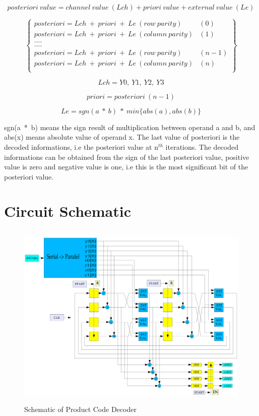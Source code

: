 \documentclass[a4paper,12pt]{report}
\begin{document}
\begin{equation}
posteriori~value = channel~value~(Lch) + priori~value +
external~value~(Le)
\end{equation}

\begin{equation}
\left\{
\begin{array}{lr}
posteriori = Lch~+~priori~+~Le~(row~parity)      & (0)\\
posteriori = Lch~+~priori~+~Le~(column~parity)   & (1)\\
....\\
....\\
posteriori = Lch~+~priori~+~Le~(row~parity)      & (n-1)\\
posteriori = Lch~+~priori~+~Le~(column~parity)   & (n)\\
\end{array}
\right\}
\end{equation}

\begin{equation}
Lch = Y0,~Y1,~Y2,~Y3
\end{equation}

\begin{equation}
priori = posteriori~(n-1)
\end{equation}

\begin{equation}
Le = sgn(a~*~b)~*~min\{abs(a),abs(b)\}
\end{equation}

sgn(a~*~b) means the sign result of multiplication between operand a and
b, and abs(x) means absolute value of operand x. The last value of
posteriori is the decoded informations, i.e the posteriori value at
n$^{th}$ iterations.  The decoded informations can be obtained from the
sign of the last posteriori value, positive value is zero and negative
value is one, i.e this is the most significant bit of the posteriori
value.

\section{Circuit Schematic}

\begin{figure}[H]
\center
\includegraphics[width=15cm,height=9.0cm]{schematic.eps}
\caption{Schematic of Product Code Decoder}
\label{schematics}
\end{figure}
\end{document}
